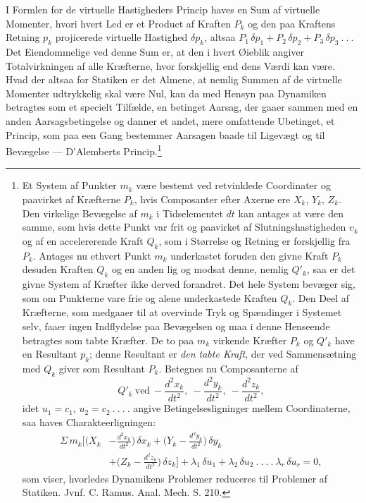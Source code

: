 \documentclass[12pt,a4paper]{book}
\begin{document}
I Formlen for de virtuelle Hastigheders Princip haves en Sum af virtuelle
Momenter, hvori hvert Led er et Product af Kraften $P_{k}$ og den paa
Kraftens Retning $p_{k}$ projicerede virtuelle Hastighed $\delta p_{k}$,
altsaa $P_{1}\, \delta p_{1} + P_{2}\, \delta p_{2} + P_{3}\,
\delta p_{3} \ .\ .\ .$ Det Eiendommelige ved denne Sum er, at den i
hvert Øieblik angiver Totalvirkningen af alle Kræfterne, hvor forskjellig
end dens Værdi kan være. Hvad der altsaa for Statiken er det Almene, at
nemlig Summen af de virtuelle Momenter udtrykkelig skal være Nul, kan da
med Hensyn paa Dynamiken betragtes som et specielt Tilfælde, en betinget
Aarsag, der gaaer sammen med en anden Aarsagsbetingelse og danner et
andet, mere omfattende Ubetinget, et Princip, som paa een Gang bestemmer
Aarsagen baade til Ligevægt og til Bevægelse --- D'Alemberts
Princip.\footnote{Et System af Punkter $m_{k}$ være bestemt ved
retvinklede Coordinater og paavirket af Kræfterne $P_{k}$, hvis
Composanter efter Axerne ere $X_{k}$, $Y_{k}$, $Z_{k}$. Den virkelige
Bevægelse af $m_{k}$ i Tidselementet $dt$ kan antages at være den samme,
som hvis dette Punkt var frit og paavirket af Slutningshastigheden
$v_{k}$ og af en accelererende Kraft $Q_{k}$, som i Størrelse
og Retning er forskjellig fra $P_{k}$. Antages nu ethvert Punkt $m_{k}$
underkastet foruden den givne Kraft $P_{k}$ desuden Kraften $Q_{k}$ og en
anden lig og modsat denne, nemlig $Q'_{k}$, saa er det givne System af
Kræfter ikke derved forandret. Det hele System bevæger sig, som om
Punkterne vare frie og alene underkastede Kraften $Q_{k}$. Den Deel af
Kræfterne, som medgaaer til at overvinde Tryk og Spændinger i Systemet
selv, faaer ingen Indflydelse paa Bevægelsen og maa i denne Henseende
betragtes som tabte Kræfter. De to paa $m_{k}$ virkende Kræfter $P_{k}$
og $Q'_{k}$ have en Resultant $p_{k}$; denne Resultant er \emph{den tabte
Kraft}, der ved Sammensætning med $Q_{k}$ giver som Resultant $P_{k}$.
Betegnes nu Composanterne af
\[
Q'_{k}\ \text{ved}\ -\frac{d^{2}x_{k}}{dt^{2}},\
-\frac{d^{2}y_{k}}{dt^{2}},\ -\frac{d^{2}z_{k}}{dt^{2}},
\]
idet $u_{1} = c_{1}$, $u_{2} = c_{2} \ .\ .\ .\ .$ angive
Betingelsesligninger mellem Coordinaterne, saa haves Charakteerligningen:
\[
\begin{aligned}
\Sigma\, m_{k} \biggl[ \biggl( X_{k} &- \frac{d^{2}x_{k}}{dt^{2}}
   \biggr)\, \delta x_{k}
   + \biggl( Y_{k} - \frac{d^{2}y_{k}}{dt^{2}} \biggr)\, \delta y_{k}\\
   &+ \biggl( Z_{k} - \frac{d^{2}z_{k}}{dt^{2}} \biggr)\, \delta z_{k}
   \biggr] + \lambda_{1}\, \delta u_{1} + \lambda_{2}\, \delta u_{2}
   \ .\ .\ .\ .\ \lambda_{r}\, \delta u_{r} = 0,
\end{aligned}
\]
som viser, hvorledes Dynamikens Problemer reduceres til Problemer af
Statiken. Jvnf. C. Ramus. Anal. Mech. S. 210.}
\end{document}
